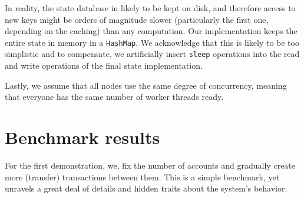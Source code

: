 In reality, the state database in likely to be kept on disk, and therefore access to new keys might
be orders of magnitude slower (particularly the first one, depending on the caching) than any
computation. Our implementation keeps the entire state in memory in a \texttt{HashMap}. We
acknowledge that this is likely to be too simplistic and to compensate, we artificially insert
\texttt{sleep} operations into the read and write operations of the final state implementation.


Lastly, we assume that all nodes use the same degree of concurrency, meaning that everyone has the
same number of worker threads ready.

\section{Benchmark results} \label{chap_b&a:sec:results}

For the first demonstration, we, fix the number of accounts and gradually create more (transfer)
transactions between them. This is a simple benchmark, yet unravels a great deal of details and
hidden traits about the system's behavior.


